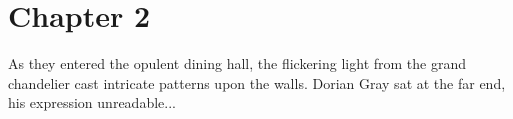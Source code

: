 \section{Chapter 2}

As they entered the opulent dining hall, the flickering light from the grand chandelier cast intricate patterns upon the walls. Dorian Gray sat at the far end, his expression unreadable...

